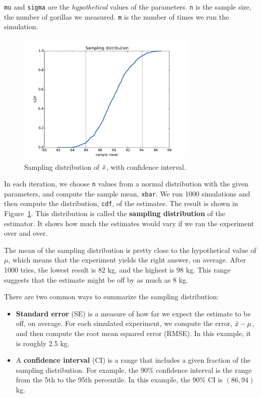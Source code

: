 \documentclass[12pt]{book}
\begin{document}
{\tt mu} and {\tt sigma} are the {\em hypothetical} values of
the parameters.  {\tt n} is the sample size, the number of
gorillas we measured.  {\tt m} is the number of times we run
the simulation.

\begin{figure}
\centerline{\includegraphics[height=2.5in]{figs/estimation1.pdf}}
\caption{Sampling distribution of $\bar{x}$, with confidence interval.}
\label{estimation1}
\end{figure}

In each iteration, we choose {\tt n} values from a normal
distribution with the given parameters, and compute the sample mean,
{\tt xbar}.  We run 1000 simulations and then compute the
distribution, {\tt cdf}, of the estimates.  The result is shown in
Figure~\ref{estimation1}.  This distribution is called the {\bf
  sampling distribution} of the estimator.  It shows how much the
estimates would vary if we ran the experiment over and over.

The mean of the sampling distribution is pretty close
to the hypothetical value of $\mu$, which means that the experiment
yields the right answer, on average.  After 1000 tries, the lowest
result is 82 kg, and the highest is 98 kg.  This range suggests that
the estimate might be off by as much as 8 kg.

There are two common ways to summarize the sampling distribution:

\begin{itemize}

\item {\bf Standard error} (SE) is a measure of how far we expect the
  estimate to be off, on average.  For each simulated experiment, we
  compute the error, $\bar{x} - \mu$, and then compute the root mean
  squared error (RMSE).  In this example, it is roughly 2.5 kg.

\item A {\bf confidence interval} (CI) is a range that includes a
  given fraction of the sampling distribution.  For example, the 90\%
  confidence interval is the range from the 5th to the 95th
  percentile.  In this example, the 90\% CI is $(86, 94)$ kg.

\end{itemize}
\end{document}
